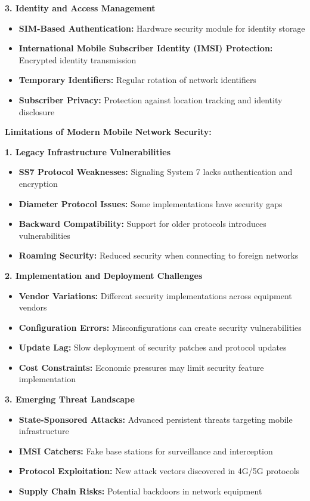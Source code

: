 \documentclass[12pt,a4paper]{article}
\begin{document}
\textbf{3. Identity and Access Management}
\begin{itemize}
    \item \textbf{SIM-Based Authentication:} Hardware security module for identity storage
    \item \textbf{International Mobile Subscriber Identity (IMSI) Protection:} Encrypted identity transmission
    \item \textbf{Temporary Identifiers:} Regular rotation of network identifiers
    \item \textbf{Subscriber Privacy:} Protection against location tracking and identity disclosure
\end{itemize}

\textbf{Limitations of Modern Mobile Network Security:}

\textbf{1. Legacy Infrastructure Vulnerabilities}
\begin{itemize}
    \item \textbf{SS7 Protocol Weaknesses:} Signaling System 7 lacks authentication and encryption
    \item \textbf{Diameter Protocol Issues:} Some implementations have security gaps
    \item \textbf{Backward Compatibility:} Support for older protocols introduces vulnerabilities
    \item \textbf{Roaming Security:} Reduced security when connecting to foreign networks
\end{itemize}

\textbf{2. Implementation and Deployment Challenges}
\begin{itemize}
    \item \textbf{Vendor Variations:} Different security implementations across equipment vendors
    \item \textbf{Configuration Errors:} Misconfigurations can create security vulnerabilities
    \item \textbf{Update Lag:} Slow deployment of security patches and protocol updates
    \item \textbf{Cost Constraints:} Economic pressures may limit security feature implementation
\end{itemize}

\textbf{3. Emerging Threat Landscape}
\begin{itemize}
    \item \textbf{State-Sponsored Attacks:} Advanced persistent threats targeting mobile infrastructure
    \item \textbf{IMSI Catchers:} Fake base stations for surveillance and interception
    \item \textbf{Protocol Exploitation:} New attack vectors discovered in 4G/5G protocols
    \item \textbf{Supply Chain Risks:} Potential backdoors in network equipment
\end{itemize}
\end{document}
